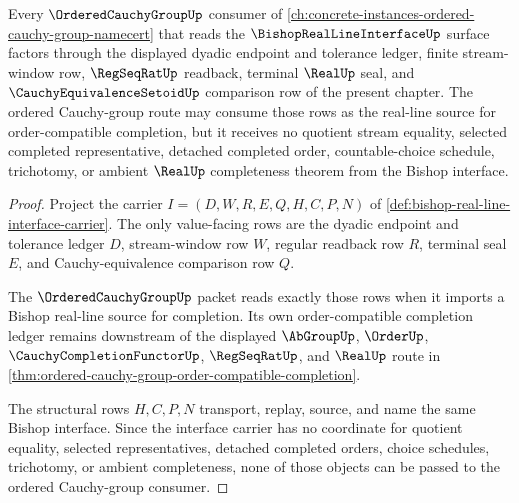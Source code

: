 \begin{theorem}
\label{thm:bishop-real-line-interface-ordered-cauchy-group-forward-route}
Every $\OrderedCauchyGroupUp$ consumer of \autoref{ch:concrete-instances-ordered-cauchy-group-namecert} that reads the $\BishopRealLineInterfaceUp$ surface factors through the displayed dyadic endpoint and tolerance ledger, finite stream-window row, $\RegSeqRatUp$ readback, terminal $\RealUp$ seal, and $\CauchyEquivalenceSetoidUp$ comparison row of the present chapter. The ordered Cauchy-group route may consume those rows as the real-line source for order-compatible completion, but it receives no quotient stream equality, selected completed representative, detached completed order, countable-choice schedule, trichotomy, or ambient $\RealUp$ completeness theorem from the Bishop interface.
\end{theorem}
\begin{proof}
Project the carrier $I=(D,W,R,E,Q,H,C,P,N)$ of \autoref{def:bishop-real-line-interface-carrier}. The only value-facing rows are the dyadic endpoint and tolerance ledger $D$, stream-window row $W$, regular readback row $R$, terminal seal $E$, and Cauchy-equivalence comparison row $Q$.

The $\OrderedCauchyGroupUp$ packet reads exactly those rows when it imports a Bishop real-line source for completion. Its own order-compatible completion ledger remains downstream of the displayed $\AbGroupUp$, $\OrderUp$, $\CauchyCompletionFunctorUp$, $\RegSeqRatUp$, and $\RealUp$ route in \autoref{thm:ordered-cauchy-group-order-compatible-completion}.

The structural rows $H,C,P,N$ transport, replay, source, and name the same Bishop interface. Since the interface carrier has no coordinate for quotient equality, selected representatives, detached completed orders, choice schedules, trichotomy, or ambient completeness, none of those objects can be passed to the ordered Cauchy-group consumer.
\end{proof}
